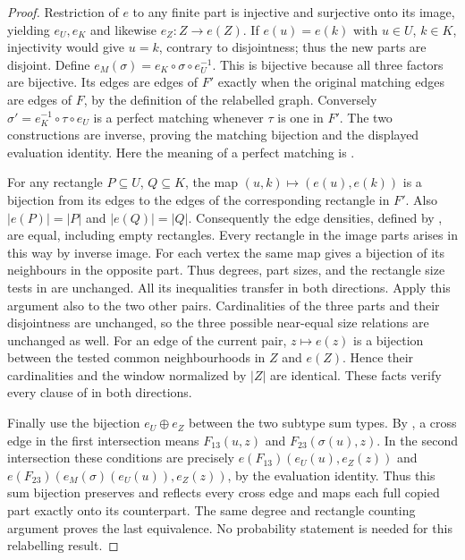 \begin{proof}
Restriction of $e$ to any finite part is injective and surjective onto
its image, yielding $e_U,e_K$ and likewise $e_Z:Z\to e(Z)$.
If $e(u)=e(k)$ with $u\in U$, $k\in K$, injectivity would give
$u=k$, contrary to disjointness; thus the new parts are disjoint.
Define $e_M(\sigma)=e_K\circ\sigma\circ e_U^{-1}$.
This is bijective because all three factors are bijective.
Its edges are edges of $F'$ exactly when the original matching edges
are edges of $F$, by the definition of the relabelled graph.
Conversely $\sigma'=e_K^{-1}\circ\tau\circ e_U$ is a perfect matching
whenever $\tau$ is one in $F'$. The two constructions are inverse,
proving the matching bijection and the displayed evaluation identity.
Here the meaning of a perfect matching is .

For any rectangle $P\subseteq U$, $Q\subseteq K$, the map
$(u,k)\mapsto(e(u),e(k))$ is a bijection from its edges to the edges
of the corresponding rectangle in $F'$. Also $|e(P)|=|P|$ and
$|e(Q)|=|Q|$. Consequently the edge densities, defined by
, are equal, including empty rectangles.
Every rectangle in the image parts arises in this way by inverse image.
For each vertex the same map gives a bijection of its neighbours
in the opposite part. Thus degrees, part sizes, and the rectangle
size tests in  are unchanged. All its
inequalities transfer in both directions. Apply this argument also
to the two other pairs. Cardinalities of the three parts and their
disjointness are unchanged, so the three possible near-equal size
relations are unchanged as well. For an edge of the current pair,
$z\mapsto e(z)$ is a bijection between the tested common
neighbourhoods in $Z$ and $e(Z)$. Hence their cardinalities and the
window normalized by $|Z|$ are identical. These facts verify every
clause of  in both directions.

Finally use the bijection $e_U\oplus e_Z$ between the two subtype
sum types. By , a cross edge in the
first intersection means
$F_{13}(u,z)$ and $F_{23}(\sigma(u),z)$.
In the second intersection these conditions are precisely
$e(F_{13})(e_U(u),e_Z(z))$ and
$e(F_{23})(e_M(\sigma)(e_U(u)),e_Z(z))$, by the evaluation identity.
Thus this sum bijection preserves and reflects every cross edge and
maps each full copied part exactly onto its counterpart. The same
degree and rectangle counting argument proves the last equivalence.
No probability statement is needed for this relabelling result.
\end{proof}
